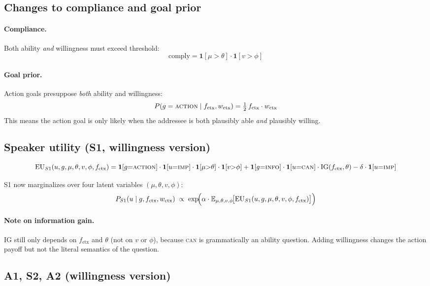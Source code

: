 \documentclass[11pt]{article}
\begin{document}
\subsection{Changes to compliance and goal prior}

\paragraph{Compliance.} Both ability \emph{and} willingness must exceed threshold:
\[
  \text{comply} = \mathbf{1}[\mu > \theta]\cdot\mathbf{1}[v > \phi]
\]

\paragraph{Goal prior.} Action goals presuppose \emph{both} ability and willingness:
\[
  P(g = \textsc{action} \mid f_{\text{ctx}}, w_{\text{ctx}}) = \tfrac{1}{2}\,f_{\text{ctx}}\cdot w_{\text{ctx}}
\]
This means the action goal is only likely when the addressee is both plausibly
able \emph{and} plausibly willing.

\subsection{Speaker utility (S1, willingness version)}

\[
  \mathrm{EU}_{S1}(u, g, \mu, \theta, v, \phi, f_{\text{ctx}}) =
  \mathbf{1}[g{=}\textsc{action}]\cdot\mathbf{1}[u{=}\textsc{imp}]\cdot\mathbf{1}[\mu{>}\theta]\cdot\mathbf{1}[v{>}\phi]
  + \mathbf{1}[g{=}\textsc{info}]\cdot\mathbf{1}[u{=}\textsc{can}]\cdot\mathrm{IG}(f_{\text{ctx}}, \theta)
  - \delta\cdot\mathbf{1}[u{=}\textsc{imp}]
\]

S1 now marginalizes over four latent variables $(\mu, \theta, v, \phi)$:
\[
  P_{S1}(u \mid g, f_{\text{ctx}}, w_{\text{ctx}}) \;\propto\;
  \exp\!\Bigl(\alpha\cdot
    \mathbb{E}_{\mu,\theta,v,\phi}\!\bigl[\mathrm{EU}_{S1}(u, g, \mu, \theta, v, \phi, f_{\text{ctx}})\bigr]
  \Bigr)
\]

\paragraph{Note on information gain.} IG still only depends on $f_{\text{ctx}}$ and
$\theta$ (not on $v$ or $\phi$), because \textsc{can} is grammatically an
ability question. Adding willingness changes the action payoff but not the
literal semantics of the question.

\subsection{A1, S2, A2 (willingness version)}
\end{document}
